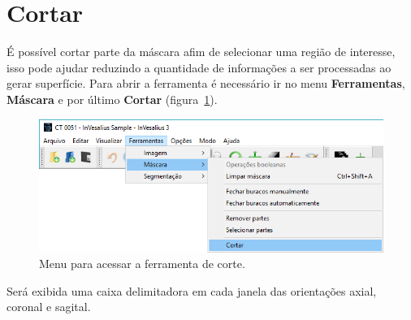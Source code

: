 \section{Cortar}

É possível cortar parte da máscara afim de selecionar uma região de interesse, isso pode ajudar reduzindo a quantidade de informações a ser processadas ao gerar superfície. Para abrir a ferramenta é necessário ir no menu \textbf{Ferramentas}, \textbf{Máscara} e por último \textbf{Cortar} (figura~\ref{fig:menu_mask_crop}).

\begin{figure}[!htb]
\centering
\includegraphics[scale=0.4]{../user_guide_figures/invesalius_screen/menu_mask_crop_pt.png}
\caption{Menu para acessar a ferramenta de corte.}
\label{fig:menu_mask_crop}
\end{figure}

Será exibida uma caixa delimitadora em cada janela das orientações axial, coronal e sagital.
